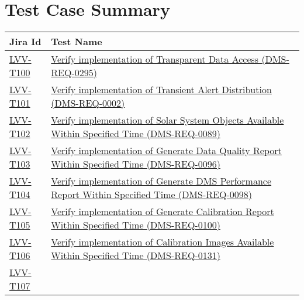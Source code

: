 \hypertarget{test-case-summary}{%
\section{Test Case Summary}\label{test-case-summary}}

\begin{longtable}[]{@{}ll@{}}
\toprule
Jira Id & Test Name\tabularnewline
\midrule
\endhead
\protect\hyperlink{lvv-t100---verify-implementation-of-transparent-data-access-dms-req-0295}{LVV-T100}
&
\href{https://jira.lsstcorp.org/secure/Tests.jspa\#/testCase/LVV-T100}{Verify
implementation of Transparent Data Access (DMS-REQ-0295)}\tabularnewline
\protect\hyperlink{lvv-t101---verify-implementation-of-transient-alert-distribution-dms-req-0002}{LVV-T101}
&
\href{https://jira.lsstcorp.org/secure/Tests.jspa\#/testCase/LVV-T101}{Verify
implementation of Transient Alert Distribution
(DMS-REQ-0002)}\tabularnewline
\protect\hyperlink{lvv-t102---verify-implementation-of-solar-system-objects-available-within-specified-time-dms-req-0089}{LVV-T102}
&
\href{https://jira.lsstcorp.org/secure/Tests.jspa\#/testCase/LVV-T102}{Verify
implementation of Solar System Objects Available Within Specified Time
(DMS-REQ-0089)}\tabularnewline
\protect\hyperlink{lvv-t103---verify-implementation-of-generate-data-quality-report-within-specified-time-dms-req-0096}{LVV-T103}
&
\href{https://jira.lsstcorp.org/secure/Tests.jspa\#/testCase/LVV-T103}{Verify
implementation of Generate Data Quality Report Within Specified Time
(DMS-REQ-0096)}\tabularnewline
\protect\hyperlink{lvv-t104---verify-implementation-of-generate-dms-performance-report-within-specified-time-dms-req-0098}{LVV-T104}
&
\href{https://jira.lsstcorp.org/secure/Tests.jspa\#/testCase/LVV-T104}{Verify
implementation of Generate DMS Performance Report Within Specified Time
(DMS-REQ-0098)}\tabularnewline
\protect\hyperlink{lvv-t105---verify-implementation-of-generate-calibration-report-within-specified-time-dms-req-0100}{LVV-T105}
&
\href{https://jira.lsstcorp.org/secure/Tests.jspa\#/testCase/LVV-T105}{Verify
implementation of Generate Calibration Report Within Specified Time
(DMS-REQ-0100)}\tabularnewline
\protect\hyperlink{lvv-t106---verify-implementation-of-calibration-images-available-within-specified-time-dms-req-0131}{LVV-T106}
&
\href{https://jira.lsstcorp.org/secure/Tests.jspa\#/testCase/LVV-T106}{Verify
implementation of Calibration Images Available Within Specified Time
(DMS-REQ-0131)}\tabularnewline
\protect\hyperlink{lvv-t107---verify-implementation-of-level-1-production-completeness-dms-req-0284}{LVV-T107}

\end{longtable}
